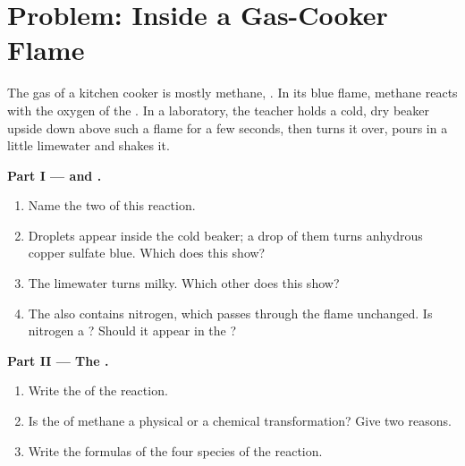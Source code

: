 \section{Problem: Inside a Gas-Cooker Flame}

\begin{problem}
\label{pb:g7:chemical-reactions:1}
The gas of a kitchen cooker is mostly methane, . In its blue
flame, methane reacts with the oxygen of the . In a laboratory, the
teacher holds a cold, dry beaker upside down above such a flame for a
few seconds, then turns it over, pours in a little limewater and shakes
it.

\medskip
\noindent\textbf{Part I ---  and .}
\begin{enumerate}
  \item Name the two  of this reaction.
  \item Droplets appear inside the cold beaker; a drop of them turns
        anhydrous copper sulfate blue. Which  does this show?
  \item The limewater turns milky. Which other  does this show?
  \item The  also contains nitrogen, which passes through the flame
        unchanged. Is nitrogen a ? Should it appear in the ?
\end{enumerate}

\medskip
\noindent\textbf{Part II --- The .}
\begin{enumerate}[resume]
  \item Write the  of the reaction.
  \item Is the  of methane a physical or a chemical
        transformation? Give two reasons.
  \item Write the formulas of the four species of the reaction.
\end{enumerate}


\end{problem}
